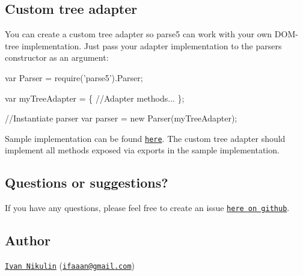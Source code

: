 \subsection*{Custom tree adapter}

You can create a custom tree adapter so parse5 can work with your own D\+O\+M-\/tree implementation. Just pass your adapter implementation to the parser\textquotesingle{}s constructor as an argument\+:


\begin{DoxyCode}
var Parser = require('parse5').Parser;

var myTreeAdapter = \{
   //Adapter methods...
\};

//Instantiate parser
var parser = new Parser(myTreeAdapter);
\end{DoxyCode}


Sample implementation can be found \href{https://github.com/inikulin/parse5/blob/master/lib/tree_adapters/default.js}{\tt here}. The custom tree adapter should implement all methods exposed via {\ttfamily exports} in the sample implementation.

\subsection*{Questions or suggestions?}

If you have any questions, please feel free to create an issue \href{https://github.com/inikulin/parse5/issues}{\tt here on github}.

\subsection*{Author}

\href{https://github.com/inikulin}{\tt Ivan Nikulin} (\href{mailto:ifaaan@gmail.com}{\tt ifaaan@gmail.\+com}) 